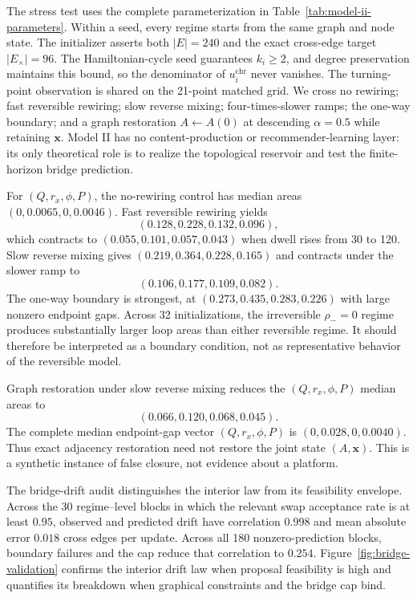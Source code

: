 \documentclass[10pt,a4paper]{article}
\begin{document}
The stress test uses the complete parameterization in Table~\ref{tab:model-ii-parameters}. Within a seed, every regime starts from the same graph and node state. The initializer asserts both $|E|=240$ and the exact cross-edge target $|E_\times|=96$. The Hamiltonian-cycle seed guarantees $k_i\geq2$, and degree preservation maintains this bound, so the denominator of $u_i^{\mathrm{chr}}$ never vanishes. The turning-point observation is shared on the 21-point matched grid. We cross no rewiring; fast reversible rewiring; slow reverse mixing; four-times-slower ramps; the one-way boundary; and a graph restoration $A\leftarrow A(0)$ at descending $\alpha=0.5$ while retaining $\bm x$. Model II has no content-production or recommender-learning layer: its only theoretical role is to realize the topological reservoir and test the finite-horizon bridge prediction.

For $(Q,r_x,\phi,P)$, the no-rewiring control has median areas $(0,0.0065,0,0.0046)$. Fast reversible rewiring yields
\begin{equation}
(0.128,0.228,0.132,0.096),
\end{equation}
which contracts to $(0.055,0.101,0.057,0.043)$ when dwell rises from 30 to 120. Slow reverse mixing gives $(0.219,0.364,0.228,0.165)$ and contracts under the slower ramp to
\begin{equation}
(0.106,0.177,0.109,0.082).
\end{equation}
The one-way boundary is strongest, at $(0.273,0.435,0.283,0.226)$ with large nonzero endpoint gaps. Across 32 initializations, the irreversible $\rho_-=0$ regime produces substantially larger loop areas than either reversible regime. It should therefore be interpreted as a boundary condition, not as representative behavior of the reversible model.

Graph restoration under slow reverse mixing reduces the $(Q,r_x,\phi,P)$ median areas to
\begin{equation}
(0.066,0.120,0.068,0.045).
\end{equation}
The complete median endpoint-gap vector $(Q,r_x,\phi,P)$ is $(0,0.028,0,0.0040)$. Thus exact adjacency restoration need not restore the joint state $(A,\bm x)$. This is a synthetic instance of false closure, not evidence about a platform.

The bridge-drift audit distinguishes the interior law from its feasibility envelope. Across the 30 regime--level blocks in which the relevant swap acceptance rate is at least $0.95$, observed and predicted drift have correlation $0.998$ and mean absolute error $0.018$ cross edges per update. Across all 180 nonzero-prediction blocks, boundary failures and the cap reduce that correlation to $0.254$. Figure~\ref{fig:bridge-validation} confirms the interior drift law when proposal feasibility is high and quantifies its breakdown when graphical constraints and the bridge cap bind.
\end{document}
